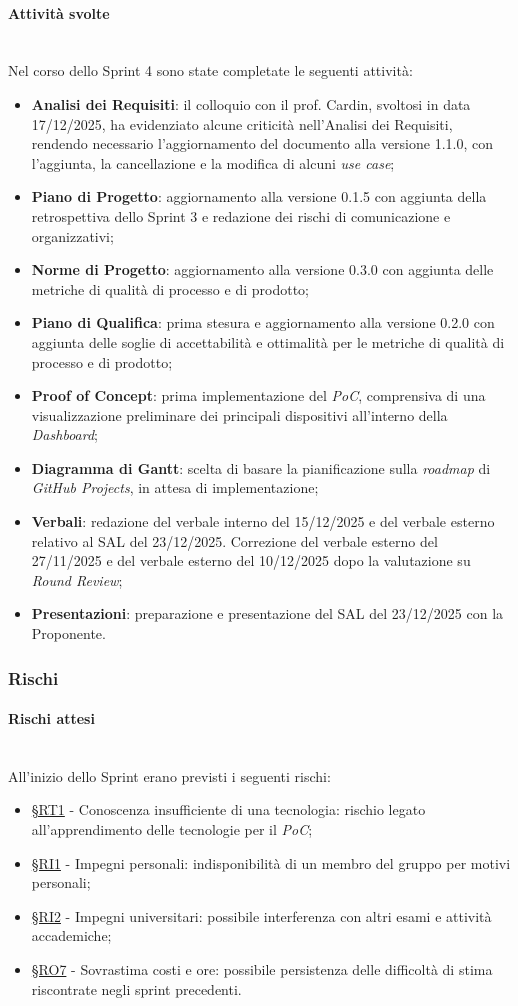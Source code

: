 \documentclass[10pt, letterpaper]{article}
\newcommand{\trisubsection}[1]{\paragraph{#1}\mbox{}\\}
\newcommand{\rif}[1]{\hyperref[#1]{§#1}}
\begin{document}
\trisubsection{Attività svolte}
Nel corso dello Sprint 4 sono state completate le seguenti attività:
\begin{itemize}
    \item \textbf{Analisi dei Requisiti}: il colloquio con il prof. Cardin, svoltosi in data 17/12/2025, ha evidenziato alcune criticità nell'Analisi dei Requisiti,
          rendendo necessario l'aggiornamento del documento alla versione 1.1.0, con l'aggiunta, la cancellazione e la modifica di alcuni \textit{use case};
    \item \textbf{Piano di Progetto}: aggiornamento alla versione 0.1.5 con aggiunta della retrospettiva dello Sprint 3 e redazione dei rischi di comunicazione e organizzativi;
    \item \textbf{Norme di Progetto}: aggiornamento alla versione 0.3.0 con aggiunta delle metriche di qualità di processo e di prodotto;
    \item \textbf{Piano di Qualifica}: prima stesura e aggiornamento alla versione 0.2.0 con aggiunta delle soglie di accettabilità e ottimalità per le metriche di qualità di processo e di prodotto;
    \item \textbf{Proof of Concept}: prima implementazione del \textit{PoC}, comprensiva di una visualizzazione preliminare dei principali dispositivi all'interno della \textit{Dashboard};
    \item \textbf{Diagramma di Gantt}: scelta di basare la pianificazione sulla \textit{roadmap} di \textit{GitHub Projects}, in attesa di implementazione;
    \item \textbf{Verbali}: redazione del verbale interno del 15/12/2025 e del verbale esterno relativo al SAL del 23/12/2025. Correzione del verbale esterno del 27/11/2025 e del verbale esterno del 10/12/2025 dopo la valutazione su \textit{Round Review};
    \item \textbf{Presentazioni}: preparazione e presentazione del SAL del 23/12/2025 con la Proponente.
\end{itemize}

\subsubsection{Rischi}
\trisubsection{Rischi attesi}
All'inizio dello Sprint erano previsti i seguenti rischi:
\begin{itemize}
    \item \rif{RT1} - Conoscenza insufficiente di una tecnologia: rischio legato all'apprendimento delle tecnologie per il \textit{PoC};
    \item \rif{RI1} - Impegni personali: indisponibilità di un membro del gruppo per motivi personali;
    \item \rif{RI2} - Impegni universitari: possibile interferenza con altri esami e attività accademiche;
    \item \rif{RO7} - Sovrastima costi e ore: possibile persistenza delle difficoltà di stima riscontrate negli sprint precedenti.
\end{itemize}
\end{document}
